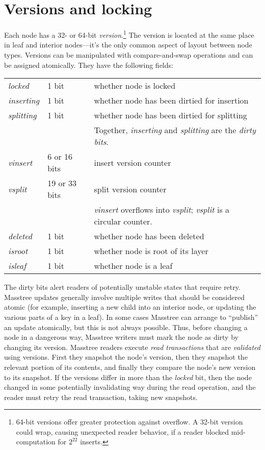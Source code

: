 \documentclass[11pt]{article}
\newcommand{\V}[1]{\textit{#1}}
\begin{document}
\section{Versions and locking}

Each node has a 32- or 64-bit \emph{version}.\footnote{64-bit versions
offer greater protection against overflow. A 32-bit version could wrap,
causing unexpected reader behavior, if a reader blocked mid-computation
for \(2^{22}\) inserts.} The version is located at the same place in
leaf and interior nodes---it's the only common aspect of layout between
node types. Versions can be manipulated with compare-and-swap operations
and can be assigned atomically. They have the following fields:

\begin{flushleft}
\begin{tabular}{@{}lll}
\V{locked} & 1 bit & whether node is locked \\
\V{inserting} & 1 bit & whether node has been dirtied for insertion \\
\V{splitting} & 1 bit & whether node has been dirtied for splitting \\
&& Together, \V{inserting} and \V{splitting} are the \emph{dirty bits}. \\
\V{vinsert} & 6 or 16 bits & insert version counter \\
\V{vsplit} & 19 or 33 bits & split version counter \\
&& \V{vinsert} overflows into \V{vsplit}; \V{vsplit} is a circular
counter. \\
\V{deleted} & 1 bit & whether node has been deleted \\
\V{isroot} & 1 bit & whether node is root of its layer \\
\V{isleaf} & 1 bit & whether node is a leaf \\
\end{tabular}
\end{flushleft}

The dirty bits alert readers of potentially unstable states that require
retry. Masstree updates generally involve multiple writes that should be
considered atomic (for example, inserting a new child into an interior
node, or updating the various parts of a key in a leaf). In some cases
Masstree can arrange to ``publish'' an update atomically,
but this is not always possible. Thus,
before changing a node in a dangerous way, Masstree writers must mark
the node as dirty by changing its version. Masstree readers execute
\emph{read transactions} that are \emph{validated} using versions. First
they snapshot the node's version, then they snapshot the relevant
portion of its contents, and finally they compare the node's new version
to its snapshot. If the versions differ in more than the \V{locked} bit,
then the node changed in some potentially invalidating way during the
read operation, and the reader must retry the read transaction, taking
new snapshots.
\end{document}
